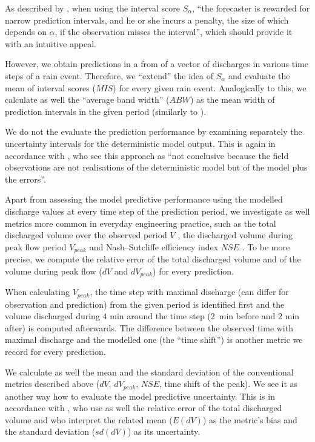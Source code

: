 \documentclass{ctuthesis}\usepackage[]{graphicx}\usepackage[]{color}
\begin{document}
As described by \cite{gneiting2007strictly}, when using the interval score $S_\alpha$, \enquote{the forecaster is rewarded for narrow prediction intervals, and he or she incurs a penalty, the size of which depends on $\alpha$, if the observation misses the interval}, which should provide it with an intuitive appeal.

However, we obtain predictions in a from of a vector of discharges in various time steps of a rain event. Therefore, we \enquote{extend} the idea of  $S_\alpha$ and evaluate the mean of interval scores ($M\!I\!S$) for every given   rain event. Analogically to this, we calculate as well the \enquote{average band width} ($A\!B\!W$) as the mean width of prediction intervals in the given period (similarly to \cite{giudice2013improving}).

We do not the evaluate the prediction performance  by examining separately the uncertainty intervals for the deterministic model output. This is again in accordance with \cite{giudice2013improving}, who see this approach as \enquote{not conclusive because the field observations are not realisations of the deterministic model but of the model plus the errors}.

Apart from assessing the model  predictive performance using the modelled discharge values at every time step of the prediction period, we investigate as well metrics more common in everyday engineering practice, such as the total discharged volume over the observed period $V$ \citep[e.g.][]{fencl2013assessing}, the discharged volume during peak flow period $V_{peak}$  and Nash–Sutcliffe efficiency index $N\!S\!E$ \citep{nash1970river}. To be more precise, we compute the relative error of the total discharged volume and of the volume during peak flow ($dV$ and $dV_{peak}$) for every prediction. 

When calculating $V_{peak}$, the time step with maximal discharge (can differ for observation and prediction) from the given period is identified first and the volume discharged during $4$ min around the time step (\mbox{$2$ min} before and $2$ min after) is computed afterwards. The difference between the observed time with maximal discharge and the modelled one (the \enquote{time shift}) is another metric we record for every prediction.

We calculate as well the mean and the standard deviation of the conventional metrics described above ($dV$, $dV_{peak}$, $N\!S\!E$, time shift of the peak). We see it as another way how to evaluate the model  predictive uncertainty. This is in accordance with \cite{fencl2013assessing}, who use as well the relative error of the total discharged volume and who interpret the related mean ($E(dV)$) as the metric's  bias and the standard deviation  ($sd(dV)$) as its uncertainty. 
\end{document}
